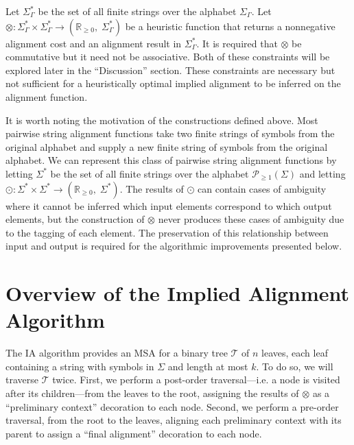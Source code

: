 \documentclass{bmcart}
\newcommand*\NEPowerset{\mathcal{P}_{\geq 1}}
\newcommand*\NonNegReals{\mathbb{R}_{\geq 0}}
\begin{document}
Let $\Sigma^{*}_{\Gamma}$ be the set of all finite strings over the alphabet $\Sigma_{\Gamma}$.
Let $\otimes : \Sigma^{*}_{\Gamma} \times \Sigma^{*}_{\Gamma} \rightarrow \left(\NonNegReals,\; \Sigma^{*}_{\Gamma}\right)$ be a heuristic function that returns a nonnegative alignment cost and an alignment result in $\Sigma^{*}_{\Gamma}$.
It is required that $\otimes$ be commutative but it need not be associative.
Both of these constraints will be explored later in the ``Discussion'' section.
These constraints are necessary but not sufficient for a heuristically optimal implied alignment to be inferred on the alignment function.

It is worth noting the motivation of the constructions defined above. 
Most pairwise string alignment functions take two finite strings of symbols from the original alphabet and supply a new finite string of symbols from the original alphabet.
We can represent this class of pairwise string alignment functions by letting $\Sigma^{*}$ be the set of all finite strings over the alphabet $\NEPowerset (\Sigma)$ and letting $\odot: \Sigma^{*} \times \Sigma^{*} \rightarrow \left(\NonNegReals,\; \Sigma^{*} \right)$.
The results of $\odot$ can contain cases of ambiguity where it cannot be inferred which input elements correspond to which output elements, but the construction of $\otimes$ never produces these cases of ambiguity due to the tagging of each element.
The preservation of this relationship between input and output is required for the algorithmic improvements presented below.


\section*{Overview of the Implied Alignment Algorithm}

The IA algorithm provides an MSA for a binary tree $\mathcal{T}$ of $n$ leaves, each leaf containing a string with symbols in $\Sigma$ and length at most $k$.
To do so, we will traverse $\mathcal{T}$ twice.
First, we perform a post-order traversal---i.e. a node is visited after its children---from the leaves to the root, assigning the results of $\otimes$ as a ``preliminary context'' decoration to each node.
Second, we perform a pre-order traversal, from the root to the leaves, aligning each preliminary context with its parent to assign a ``final alignment'' decoration to each node.
\end{document}
